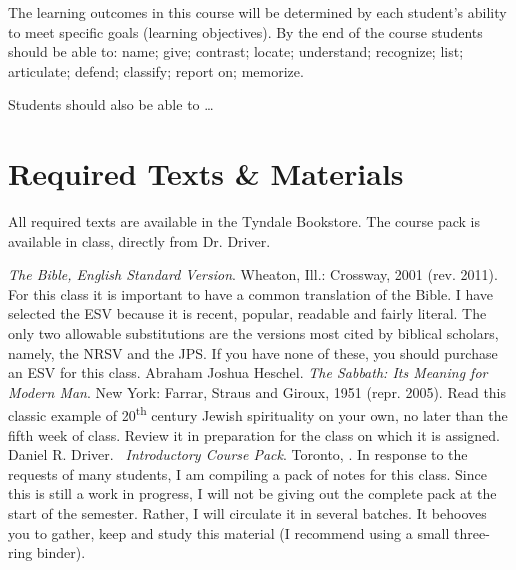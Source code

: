 \documentclass[titlepage]{article}
\begin{document}
The learning outcomes in this course will be determined by each
student's ability to meet specific goals (learning objectives). By the
end of the course students should be able to:
  name;
  give;
  contrast;
  locate;
  understand;
  recognize;
  list;
  articulate;
  defend;
  classify;
  report on;
  memorize.

Students should also be able to \ldots

\section{Required Texts \& Materials}
\label{texts}

All required texts are available in the Tyndale Bookstore. The course
pack is available in class, directly from Dr. Driver.

\begingroup
\renewcommand{\section}[2]{}%
\begin{thebibliography}{Heschel}%
   \emph{The Bible, English Standard Version}.
    Wheaton, Ill.: Crossway, 2001 (rev. 2011). For this class it is
    important to have a common translation of the Bible. I have selected
    the ESV because it is recent, popular, readable and fairly literal.
    The only two allowable substitutions are the versions most cited by
    biblical scholars, namely, the NRSV and the JPS. If you have none of
    these, you should purchase an ESV for this class.
   Abraham Joshua Heschel.
    \emph{The Sabbath: Its Meaning for Modern Man}. New York: Farrar,
    Straus and Giroux, 1951 (repr. 2005). Read this classic example of
    20\textsuperscript{th} century Jewish spirituality on your own, no
    later than the fifth week of class. Review it in preparation for the
    class on which it is assigned.
   Daniel R. Driver.
    \emph{\coursetitle\ Introductory Course Pack}. Toronto, \csemester.
    In response to the requests of many students, I am compiling a pack
    of notes for this class. Since this is still a work in progress,
    I will not be giving out the complete pack at the start of the
    semester. Rather, I will circulate it in several batches. It
    behooves you to gather, keep and study this material (I recommend
    using a small three-ring binder).
\end{thebibliography}
\endgroup
\end{document}
